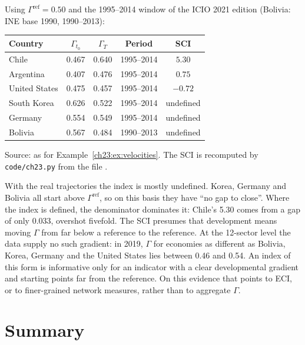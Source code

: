 \documentclass[../structural_economics_book.tex]{subfiles}
\begin{document}
\begin{example}\label{ch23:ex:SCI}
Using $\Gamma^{\text{ref}} = 0.50$ and the 1995--2014 window of the ICIO 2021 edition (Bolivia: INE base 1990, 1990--2013):
\begin{center}
\begin{tabular}{lcccc}
\toprule
Country & $\Gamma_{t_0}$ & $\Gamma_T$ & Period & SCI \\
\midrule
Chile & 0.467 & 0.640 & 1995--2014 & $5.30$ \\
Argentina & 0.407 & 0.476 & 1995--2014 & $0.75$ \\
United States & 0.475 & 0.457 & 1995--2014 & $-0.72$ \\
South Korea & 0.626 & 0.522 & 1995--2014 & undefined \\
Germany & 0.554 & 0.549 & 1995--2014 & undefined \\
Bolivia & 0.567 & 0.484 & 1990--2013 & undefined \\
\bottomrule
\end{tabular}
\end{center}
\par{\footnotesize Source: as for Example~\ref{ch23:ex:velocities}. The SCI is recomputed by \texttt{code/ch23.py} from the file .\par}

With the real trajectories the index is mostly undefined. Korea, Germany and Bolivia all start above $\Gamma^{\text{ref}}$, so on this basis they have ``no gap to close''. Where the index is defined, the denominator dominates it: Chile's 5.30 comes from a gap of only 0.033, overshot fivefold. The SCI presumes that development means moving $\Gamma$ from far below a reference to the reference. At the 12-sector level the data supply no such gradient: in 2019, $\Gamma$ for economies as different as Bolivia, Korea, Germany and the United States lies between 0.46 and 0.54. An index of this form is informative only for an indicator with a clear developmental gradient and starting points far from the reference. On this evidence that points to ECI, or to finer-grained network measures, rather than to aggregate $\Gamma$.
\end{example}


\section{Summary}
\label{ch23:sec:summary}
\end{document}
